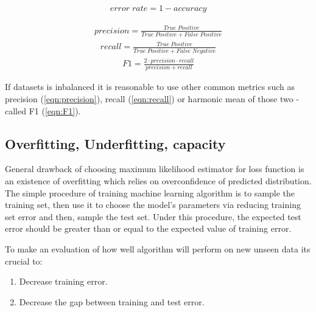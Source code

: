 \documentclass[12pt]{article}
\theoremstyle{definition}
\DeclareRobustCommand{\[}{\begin{equation}}
\DeclareRobustCommand{\]}{\end{equation}}
\begin{document}
        \begin{equation}
                \begin{align}
                   error\;rate = 1 - accuracy 
                \end{align}     
                \label{eqn:error-rate}
        \end{equation}
        
        
        \begin{equation}
            \begin{align}
               precision = \frac{True\;Positive}{True\;Positive + False\;Positive}
            \end{align}     
            \label{eqn:precision}
        \end{equation}
        \begin{equation}
            \begin{align}
               recall = \frac{True\;Positive}{True\;Positive + False\;Negative}
            \end{align}     
            \label{eqn:recall}
        \end{equation}
        \begin{equation}
                \begin{align}
                   F1 = \frac{2 \cdot precision\cdot recall}{precision + recall}
                \end{align}     
                \label{eqn:F1}
        \end{equation}
        
        If datasets is inbalanced it is reasonable to use other common metrics such as precision (\ref{eqn:precision}), recall (\ref{eqn:recall}) or harmonic mean of those two - called F1 (\ref{eqn:F1}).
        
    \subsection{Overfitting, Underfitting, capacity}
        General drawback of choosing maximum likelihood estimator for loss function is an existence of overfitting which relies on overconfidence of predicted distribution. The simple procedure of training machine learning algorithm is to sample the training set, then use it to choose the model's parameters via reducing training set error and then, sample the test set. Under this procedure, the expected test error should be greater than or equal to
        the expected value of training error. \par
        To make an evaluation of how well algorithm will perform on new unseen data its crucial to:
        \begin{enumerate}
            \item Decrease training error.
            \item Decrease the gap between training and test error.
        \end{enumerate}
\end{document}
